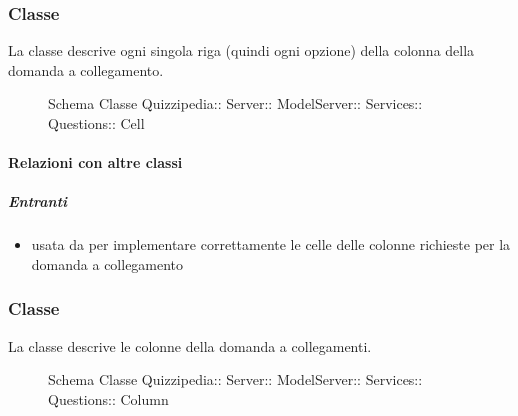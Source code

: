 \subsubsection{Classe }
La classe descrive ogni singola riga (quindi ogni opzione) della colonna della domanda a collegamento.
\begin{figure}[H]
\centering
\noindent{}
\caption[Schema Classe Cell]{Schema Classe Quizzipedia:: Server:: ModelServer:: Services:: Questions:: Cell}
\end{figure}
\paragraph{Relazioni con altre classi}
\subparagraph{Entranti}
\begin{itemize}
\item usata da  per implementare correttamente le celle delle colonne richieste per la domanda a collegamento
\end{itemize}
\subsubsection{Classe }
La classe descrive le colonne della domanda a collegamenti.
\begin{figure}[H]
\centering
\noindent{}
\caption[Schema Classe Column]{Schema Classe Quizzipedia:: Server:: ModelServer:: Services:: Questions:: Column}
\end{figure}
